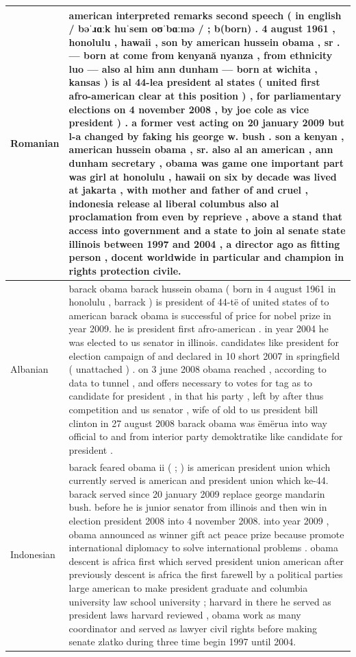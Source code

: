 \documentclass[11pt]{article}
\begin{document}
\begin{center}
\begin{longtable}{|p{1.5cm}|p{13cm}|}
Romanian & {american interpreted remarks second speech ( in english / bəˈɹɑːk huˈseɪn oʊˈbɑːmə / ; b(born) . 4 august 1961 , honolulu , hawaii , son by american hussein obama , sr . — born at come from kenyană nyanza , from ethnicity luo — also al him ann dunham — born at wichita , kansas ) is al 44-lea president al states ( united first afro-american clear at this position ) , for parliamentary elections on 4 november 2008 , by joe cole as vice president ) . a former vest acting on 20 january 2009 but l-a changed by faking his george w. bush . son a kenyan , american hussein obama , sr. also al an american , ann dunham secretary , obama was game one important part was girl at honolulu , hawaii on six by decade was lived at jakarta , with mother and father of and cruel , indonesia release al liberal columbus also al proclamation from even by reprieve , above a stand that access into government and a state to join al senate state illinois between 1997 and 2004 , a director ago as fitting person , docent worldwide in particular and champion in rights protection civile.}\\
\hline
Albanian & {barack obama barack hussein obama ( born in 4 august 1961 in honolulu , barrack ) is president of 44-të of united states of to american barack obama is successful of price for nobel prize in year 2009. he is president first afro-american . in year 2004 he was elected to us senator in illinois. candidates like president for election campaign of and declared in 10 short 2007 in springfield ( unattached ) . on 3 june 2008 obama reached , according to data to tunnel , and offers necessary to votes for tag as to candidate for president , in that his party , left by after thus competition and us senator , wife of old to us president bill clinton in 27 august 2008 barack obama was ëmërua into way official to and from interior party demoktratike like candidate for president .} \\
\hline
Indonesian & {barack feared obama ii ( ; ) is american president union which currently served is american and president union which ke-44. barack served since 20 january 2009 replace george mandarin bush. before he is junior senator from illinois and then win in election president 2008 into 4 november 2008. into year 2009 , obama announced as winner gift act peace prize because promote international diplomacy to solve international problems . obama descent is africa first which served president union american after previously descent is africa the first farewell by a political parties large american to make president graduate and columbia university law school university ; harvard in there he served as president laws harvard reviewed , obama work as many coordinator and served as lawyer civil rights before making senate zlatko during three time begin 1997 until 2004.} \\

\end{longtable}
\end{center}
\end{document}
